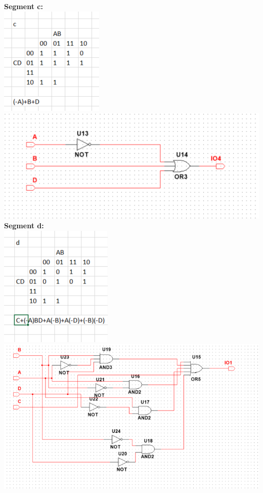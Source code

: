 \documentclass[12pt,a4paper]{article}
\begin{document}
\textbf{Segment c:}\\
\includegraphics[scale=0.8]{7seg/seg2}\\
\includegraphics[scale=1]{7seg/seg2circ}\\
\textbf{Segment d:}\\
\includegraphics[scale=0.8]{7seg/seg3}\\
\includegraphics[scale=1]{7seg/seg3circ}\\
\end{document}
